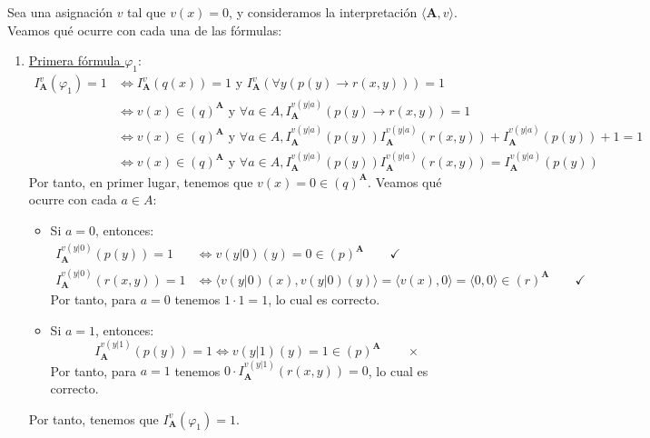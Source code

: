 \documentclass[12pt]{article}
\renewcommand{\bf}[1]{\mathbf{#1}}
\begin{document}
\begin{ejercicio}
    Sea una asignación $v$ tal que $v(x) = 0$, y consideramos la interpretación $\langle \bf{A}, v\rangle$.
    Veamos qué ocurre con cada una de las fórmulas:
    \begin{enumerate}
        \item \ul{Primera fórmula $\varphi_1$}:
        \begin{align*}
            I_{\bf{A}}^v(\varphi_1) = 1 &\Longleftrightarrow
            I_{\bf{A}}^v(q(x)) = 1 \text{ y } I_{\bf{A}}^v(\forall y\left( p(y) \rightarrow r(x,y) \right)) = 1\\
            & \Longleftrightarrow v(x)\in (q)^{\bf{A}} \text{ y } \forall a\in A, I_{\bf{A}}^{v(y|a)} (p(y) \rightarrow r(x,y)) = 1\\
            & \Longleftrightarrow v(x)\in (q)^{\bf{A}} \text{ y } \forall a\in A, I_{\bf{A}}^{v(y|a)}(p(y))I_{\bf{A}}^{v(y|a)}(r(x,y)) + I_{\bf{A}}^{v(y|a)}(p(y)) +1 = 1\\
            & \Longleftrightarrow v(x)\in (q)^{\bf{A}} \text{ y } \forall a\in A, I_{\bf{A}}^{v(y|a)}(p(y))I_{\bf{A}}^{v(y|a)}(r(x,y)) = I_{\bf{A}}^{v(y|a)}(p(y))
        \end{align*}
        Por tanto, en primer lugar, tenemos que $v(x)=0\in (q)^{\bf{A}}$. Veamos qué ocurre con cada $a\in A$:
        \begin{itemize}
            \item Si $a=0$, entonces:
            \begin{align*}
                I_{\bf{A}}^{v(y|0)}(p(y)) = 1 &\Longleftrightarrow v(y|0)(y) = 0 \in (p)^{\bf{A}} \qquad \checkmark \\
                I_{\bf{A}}^{v(y|0)}(r(x,y)) = 1 &\Longleftrightarrow \langle v(y|0)(x), v(y|0)(y)\rangle = \langle v(x), 0\rangle = \langle 0, 0\rangle \in (r)^{\bf{A}} \qquad \checkmark
            \end{align*}
            Por tanto, para $a=0$ tenemos $1\cdot 1 = 1$, lo cual es correcto.
    
            \item Si $a=1$, entonces:
            \begin{equation*}
                I_{\bf{A}}^{v(y|1)}(p(y)) = 1 \Longleftrightarrow v(y|1)(y) = 1 \in (p)^{\bf{A}} \qquad \times
            \end{equation*}
            Por tanto, para $a=1$ tenemos $0\cdot I_{\bf{A}}^{v(y|1)}(r(x,y)) = 0$, lo cual es correcto.
        \end{itemize}
        Por tanto, tenemos que $I_{\bf{A}}^v(\varphi_1) = 1$.
        \begin{comment}
            Además, para cada $a\in A$ tal que
            $I_{\bf{A}}^{v(y|a)}(p(y)) = 1$, tenemos que $I_{\bf{A}}^{v(y|a)}(r(x,y)) = 1$.
            Es decir, para cada $a\in A$ tal que $a\in (p)^{\bf{A}}$, tenemos que $\langle v(x), a\rangle\in (r)^{\bf{A}}$.
        \end{comment}


\end{enumerate}
\end{ejercicio}
\end{document}
